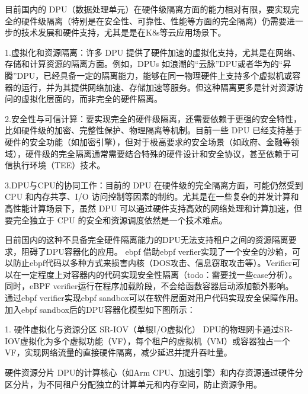 目前国内的 DPU（数据处理单元）在硬件级隔离方面的能力相对有限，要实现完全的硬件级隔离（特别是在安全性、可靠性、性能等方面的完全隔离）仍需要进一步的技术发展和硬件支持，尤其是是在K8s等云应用场景下。

1.虚拟化和资源隔离：许多 DPU 提供了硬件加速的虚拟化支持，尤其是在网络、存储和计算资源的隔离方面。例如，DPUs 如浪潮的“云脉”DPU或者华为的“昇腾”DPU，已经具备一定的隔离能力，能够在同一物理硬件上支持多个虚拟机或容器的运行，并为其提供网络加速、存储加速等服务。但这种隔离更多是针对资源访问的虚拟化层面的，而非完全的硬件隔离。

2.安全性与可信计算：要实现完全的硬件级隔离，还需要依赖于更强的安全特性，比如硬件级的加密、完整性保护、物理隔离等机制。目前一些 DPU 已经支持基于硬件的安全功能（如加密引擎），但对于极高要求的安全场景（如政府、金融等领域），硬件级的完全隔离通常需要结合特殊的硬件设计和安全协议，甚至依赖于可信执行环境（TEE）技术。

3.DPU与CPU的协同工作：目前的 DPU 在硬件级的完全隔离方面，可能仍然受到 CPU 和内存共享、I/O 访问控制等因素的制约。尤其是在一些复杂的并发计算和高性能计算场景下，虽然 DPU 可以通过硬件支持高效的网络处理和计算加速，但要完全独立于 CPU 的安全和资源调度依然是一个技术难点。

目前国内的这种不具备完全硬件隔离能力的DPU无法支持租户之间的资源隔离要求，阻碍了DPU容器化的应用。
ebpf 借助ebpf verfier实现了一个安全的沙箱，可以防止ebpf代码以多种方式来损害内核（DOS攻击、信息窃取攻击等）。Verifier可以在一定程度上对容器内的代码实现安全性隔离（todo：需要找一些case分析）。同时，eBPF verifier运行在程序加载阶段，不会给函数容器启动添加额外影响。 通过ebpf verifier实现ebpf sandbox可以在软件层面对用户代码实现安全保障作用。加入ebpf sandbox后的DPU容器化模型如下图所示：


1. 硬件虚拟化与资源分区
SR-IOV（单根I/O虚拟化）
DPU的物理网卡通过SR-IOV虚拟化为多个虚拟功能（VF），每个租户的虚拟机（VM）或容器独占一个VF，实现网络流量的直接硬件隔离，减少延迟并提升吞吐量。

硬件资源分片
DPU的计算核心（如Arm CPU、加速引擎）和内存资源通过硬件分区分片，为不同租户分配独立的计算单元和内存空间，防止资源争用。
